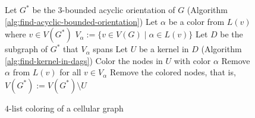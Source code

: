 \documentclass[letterpaper, 10 pt, conference]{ieeeconf}  %
\makeatletter
\newcommand{\removelatexerror}{\let\@latex@error\@gobble}
\makeatother
\begin{document}
\begin{figure}[H]
\removelatexerror
\begin{algorithm}[H]\label{alg:four-list-coloring}
  Let $G^*$ be the $3$-bounded acyclic orientation of $G$ (Algorithm \ref{alg:find-acyclic-bounded-orientation})\;
   {
  	Let $\alpha$ be a color from $L(v)$ where $v \in V(G^*)$\;
  	$V_\alpha := \lbrace v \in V(G) \mid \alpha \in L(v) \rbrace$\;
  	Let $D$ be the subgraph of $G^*$ that $V_\alpha$ spans\;
  	Let $U$ be a kernel in $D$ (Algorithm \ref{alg:find-kernel-in-dags})\;
  	Color the nodes in $U$ with color $\alpha$\;
  	Remove $\alpha$ from $L(v)$ for all $v \in V_\alpha$\;
  	Remove the colored nodes, that is, $V(G^*) := V(G^*) \setminus U$\;
  }
 \caption{$4$-list coloring of a cellular graph}
\end{algorithm}
\end{figure}

\addtolength{\textheight}{-12cm}   %




\end{document}
